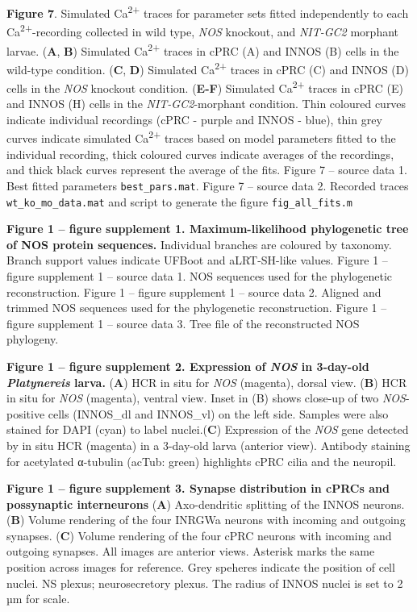 \documentclass[
  11pt,
  letterpaper,
  DIV=11,
  numbers=noendperiod]{scrartcl}
\begin{document}
\textbf{Figure 7}. Simulated Ca\textsuperscript{2+} traces for parameter
sets fitted independently to each Ca\textsuperscript{2+}-recording
collected in wild type, \emph{NOS} knockout, and \emph{NIT-GC2} morphant
larvae. (\textbf{A}, \textbf{B}) Simulated Ca\textsuperscript{2+} traces
in cPRC (A) and INNOS (B) cells in the wild-type condition. (\textbf{C},
\textbf{D}) Simulated Ca\textsuperscript{2+} traces in cPRC (C) and
INNOS (D) cells in the \emph{NOS} knockout condition. (\textbf{E-F})
Simulated Ca\textsuperscript{2+} traces in cPRC (E) and INNOS (H) cells
in the \emph{NIT-GC2}-morphant condition. Thin coloured curves indicate
individual recordings (cPRC - purple and INNOS - blue), thin grey curves
indicate simulated Ca\textsuperscript{2+} traces based on model
parameters fitted to the individual recording, thick coloured curves
indicate averages of the recordings, and thick black curves represent
the average of the fits. Figure 7 -- source data 1. Best fitted
parameters \texttt{best\_pars.mat}. Figure 7 -- source data 2. Recorded
traces \texttt{wt\_ko\_mo\_data.mat} and script to generate the figure
\texttt{fig\_all\_fits.m}

\textbf{Figure 1 -- figure supplement 1. Maximum-likelihood phylogenetic
tree of NOS protein sequences.} Individual branches are coloured by
taxonomy. Branch support values indicate UFBoot and aLRT-SH-like values.
Figure 1 -- figure supplement 1 -- source data 1. NOS sequences used for
the phylogenetic reconstruction. Figure 1 -- figure supplement 1 --
source data 2. Aligned and trimmed NOS sequences used for the
phylogenetic reconstruction. Figure 1 -- figure supplement 1 -- source
data 3. Tree file of the reconstructed NOS phylogeny.

\textbf{Figure 1 -- figure supplement 2. Expression of \emph{NOS} in
3-day-old \emph{Platynereis} larva.} (\textbf{A}) HCR in situ for
\emph{NOS} (magenta), dorsal view. (\textbf{B}) HCR in situ for
\emph{NOS} (magenta), ventral view. Inset in (B) shows close-up of two
\emph{NOS}-positive cells (INNOS\_dl and INNOS\_vl) on the left side.
Samples were also stained for DAPI (cyan) to label nuclei.(\textbf{C})
Expression of the \emph{NOS} gene detected by in situ HCR (magenta) in a
3-day-old larva (anterior view). Antibody staining for acetylated
α-tubulin (acTub: green) highlights cPRC cilia and the neuropil.

\textbf{Figure 1 -- figure supplement 3. Synapse distribution in cPRCs
and possynaptic interneurons} (\textbf{A}) Axo-dendritic splitting of
the INNOS neurons. (\textbf{B}) Volume rendering of the four INRGWa
neurons with incoming and outgoing synapses. (\textbf{C}) Volume
rendering of the four cPRC neurons with incoming and outgoing synapses.
All images are anterior views. Asterisk marks the same position across
images for reference. Grey speheres indicate the position of cell
nuclei. NS plexus; neurosecretory plexus. The radius of INNOS nuclei is
set to 2 µm for scale.
\end{document}
